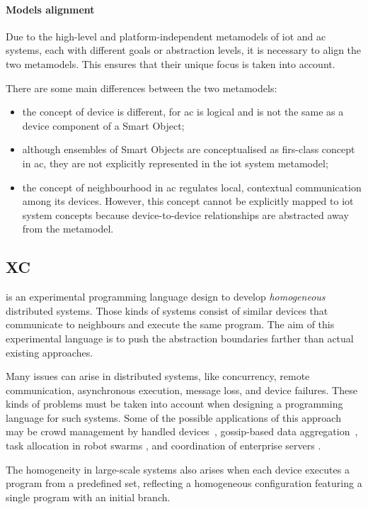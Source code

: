 \paragraph{Models alignment}
Due to the high-level and platform-independent metamodels of \ac{iot} and \ac{ac} systems, each with different goals or
abstraction levels, it is necessary to align the two metamodels.
This ensures that their unique focus is taken into account.

There are some main differences between the two metamodels:
\begin{itemize}
    \item the concept of device is different, for \ac{ac} is logical and is not the same as a device component of a Smart Object;
    \item although ensembles of Smart Objects are conceptualised as firs-class concept in \ac{ac}, they are not explicitly
        represented in the \ac{iot} system metamodel;
    \item the concept of neighbourhood in \ac{ac} regulates local, contextual communication among its devices.
        However, this concept cannot be explicitly mapped to \ac{iot} system concepts because device-to-device relationships
        are abstracted away from the metamodel.
\end{itemize}

\subsection{XC}
\label{subsec:xc}
\xc{} is an experimental programming language design to develop \emph{homogeneous} distributed systems.
Those kinds of systems consist of similar devices that communicate to neighbours and execute the same program.
The aim of this experimental language is to push the abstraction boundaries farther than actual existing approaches.

Many issues can arise in distributed systems, like concurrency, remote communication, asynchronous execution, message
loss, and device failures.
These kinds of problems must be taken into account when designing a programming language for such systems.
Some of the possible applications of this approach may be crowd management by handled devices~\cite{7274429},
gossip-based data aggregation~\cite{10.1145/1082469.1082470}, task allocation in robot swarms \cite{swarms1,420661},
and coordination of enterprise servers \cite{7306601}.

The homogeneity in large-scale systems also arises when each device executes a program from a predefined set, reflecting
a homogeneous configuration featuring a single program with an initial branch.

